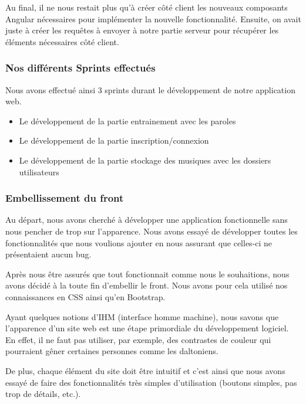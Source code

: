 \documentclass[12pt,french]{article}
\begin{document}
Au final, il ne nous restait plus qu'à créer côté client les nouveaux composants Angular nécessaires pour implémenter la nouvelle fonctionnalité. Ensuite, on avait juste à créer les requêtes à envoyer à notre partie serveur pour récupérer les éléments nécessaires côté client.

\subsubsection{Nos différents Sprints effectués}

Nous avons effectué ainsi 3 sprints durant le développement de notre application web.

\begin{itemize}
	\item Le développement de la partie entrainement avec les paroles
	\item Le développement de la partie inscription/connexion
	\item Le développement de la partie stockage des musiques avec les dossiers utilisateurs
\end{itemize}


\subsubsection{Embellissement du front}

Au départ, nous avons cherché à développer une application fonctionnelle sans nous pencher de trop sur l'apparence. Nous avons essayé de développer toutes les fonctionnalités que nous voulions ajouter en nous assurant que celles-ci ne présentaient aucun bug.

\medskip

Après nous être assurés que tout fonctionnait comme nous le souhaitions, nous avons décidé à la toute fin d'embellir le front. Nous avons pour cela utilisé nos connaissances en CSS ainsi qu'en Bootstrap.

\medskip

Ayant quelques notions d'IHM (interface homme machine), nous savons que l'apparence d'un site web est une étape primordiale du développement logiciel. En effet, il ne faut pas utiliser, par exemple, des contrastes de couleur qui pourraient gêner certaines personnes comme les daltoniens.

De plus, chaque élément du site doit être intuitif et c'est ainsi que nous avons essayé de faire des fonctionnalités très simples d'utilisation (boutons simples, pas trop de détails, etc.).
\end{document}
